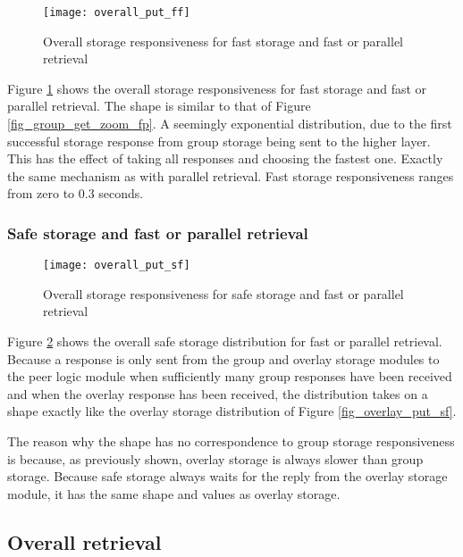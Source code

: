 \begin{figure}[htbp]
 \centering
 \texttt{[image: overall\_put\_ff]}
 \caption{Overall storage responsiveness for fast storage and fast or parallel retrieval}
 \label{fig_overall_put_ff}
\end{figure}
%
Figure \ref{fig_overall_put_ff} shows the overall storage responsiveness for fast storage and fast or parallel retrieval. The shape is similar to that of Figure \ref{fig_group_get_zoom_fp}. A seemingly exponential distribution, due to the first successful storage response from group storage being sent to the higher layer. This has the effect of taking all responses and choosing the fastest one. Exactly the same mechanism as with parallel retrieval. Fast storage responsiveness ranges from zero to 0.3 seconds.

\subsubsection{Safe storage and fast or parallel retrieval}
\begin{figure}[htbp]
 \centering
 \texttt{[image: overall\_put\_sf]}
 \caption{Overall storage responsiveness for safe storage and fast or parallel retrieval}
 \label{fig_overall_put_sf}
\end{figure}
%
Figure \ref{fig_overall_put_sf} shows the overall safe storage distribution for fast or parallel retrieval. Because a response is only sent from the group and overlay storage modules to the peer logic module when sufficiently many group responses have been received and when the overlay response has been received, the distribution takes on a shape exactly like the overlay storage distribution of Figure \ref{fig_overlay_put_sf}.

The reason why the shape has no correspondence to group storage responsiveness is because, as previously shown, overlay storage is always slower than group storage. Because safe storage always waits for the reply from the overlay storage module, it has the same shape and values as overlay storage.

\subsection{Overall retrieval}
